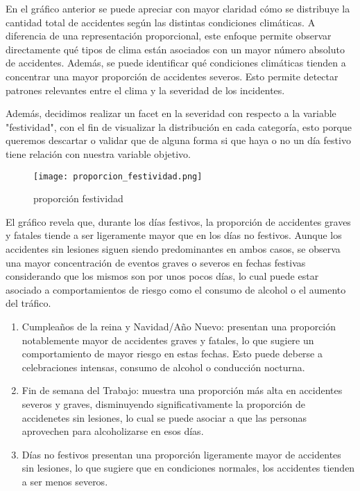\documentclass{book}
\begin{document}
En el gráfico anterior se puede apreciar con mayor claridad cómo se distribuye la cantidad total de accidentes según las distintas condiciones climáticas. A diferencia de una representación proporcional, este enfoque permite observar directamente qué tipos de clima están asociados con un mayor número absoluto de accidentes. Además, se puede identificar qué condiciones climáticas tienden a concentrar una mayor proporción de accidentes severos. Esto permite detectar patrones relevantes entre el clima y la severidad de los incidentes.

Además, decidimos realizar un facet en la severidad con respecto a la variable "festividad", con el fin de visualizar la distribución en cada categoría, esto porque queremos descartar o validar que de alguna forma si que haya o no un día festivo tiene relación con nuestra variable objetivo.

\begin{figure}[htbp]
\centering
\texttt{[image: proporcion\_festividad.png]}
\caption{\label{fig:proporción festividad}proporción festividad}
\end{figure}

El gráfico revela que, durante los días festivos, la proporción de accidentes graves y fatales tiende a ser ligeramente mayor que en los días no festivos. Aunque los accidentes sin lesiones siguen siendo predominantes en ambos casos, se observa una mayor concentración de eventos graves o severos en fechas festivas considerando que los mismos son por unos pocos días, lo cual puede estar asociado a comportamientos de riesgo como el consumo de alcohol o el aumento del tráfico.

\begin{enumerate}

\item Cumpleaños de la reina y Navidad/Año Nuevo: presentan una proporción notablemente mayor de accidentes graves y fatales, lo que sugiere un comportamiento de mayor riesgo en estas fechas. Esto puede deberse a celebraciones intensas, consumo de alcohol o conducción nocturna.

\item Fin de semana del Trabajo: muestra una proporción más alta en accidentes severos y graves, disminuyendo significativamente la proporción de accidenetes sin lesiones, lo cual se puede asociar a que las personas aprovechen para alcoholizarse en esos días.

\item Días no festivos presentan una proporción ligeramente mayor de accidentes sin lesiones, lo que sugiere que en condiciones normales, los accidentes tienden a ser menos severos.

\end{enumerate}
\end{document}
